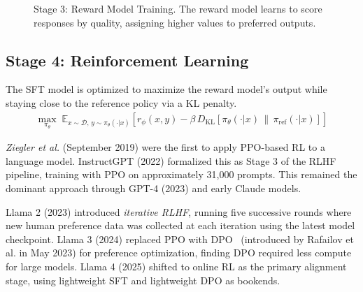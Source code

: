 \documentclass[12pt]{article}
\begin{document}
\begin{figure}[ht]
\caption{Stage 3: Reward Model Training. The reward model learns to score responses by quality, assigning higher values to preferred outputs.}
\label{fig:stage3_rm}
\end{figure}

\subsection{Stage 4: Reinforcement Learning}

The SFT model is optimized to maximize the reward model's output while staying close to the reference policy via a KL penalty.
\begin{align}
\max_{\pi_\theta} \; \mathbb{E}_{x \sim \mathcal{D},\, y \sim \pi_\theta(\cdot|x)} \left[ r_\phi(x, y) - \beta \, D_{\text{KL}}\!\left[\pi_\theta(\cdot|x) \,\|\, \pi_{\text{ref}}(\cdot|x)\right] \right]
\label{eq:rlhf_objective}
\end{align}

\textit{Ziegler et al.} (September 2019) were the first to apply PPO-based RL to a language model. InstructGPT (2022) formalized this as Stage 3 of the RLHF pipeline, training with PPO on approximately 31,000 prompts. This remained the dominant approach through GPT-4 (2023) and early Claude models.

Llama 2 (2023) introduced \textit{iterative RLHF}, running five successive rounds where new human preference data was collected at each iteration using the latest model checkpoint. Llama 3 (2024) replaced PPO with DPO~\cite{Rafailov2023DPO} (introduced by Rafailov et al. in May 2023) for preference optimization, finding DPO required less compute for large models. Llama 4 (2025) shifted to online RL as the primary alignment stage, using lightweight SFT and lightweight DPO as bookends.
\end{document}
